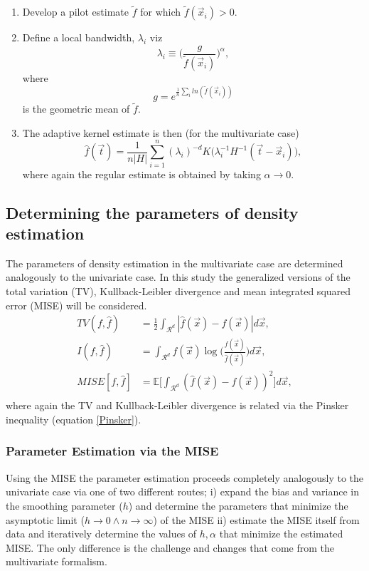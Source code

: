 \begin{enumerate}
	\item Develop a pilot estimate $\tilde{f}$ for which $\tilde{f}(\vec{x}_i)>0$.
	\item Define a local bandwidth, $\lambda_i$ viz
	\begin{equation}
		\lambda_i\equiv \bigg(\frac{g}{\tilde{f}(\vec{x}_i)}\bigg)^\alpha,
	\end{equation}
	where
	\begin{equation}
		g=e^{\frac{1}{n}\sum_{i}ln(\tilde{f}(\vec{x}_i))}
	\end{equation}
	is the geometric mean of $\tilde{f}$.
	\item The adaptive kernel estimate is then (for the multivariate case) 
	\begin{equation}
		\hat{f}(\vec{t})=\frac{1}{n|H|}\sum_{i=1}^n(\lambda_i)^{-d}K\big(\lambda_i^{-1}H^{-1}(\vec{t}-\vec{x}_i)\big),
		\label{rescaled2}
	\end{equation}
	where again the regular estimate is obtained by taking $\alpha\rightarrow 0$.
\end{enumerate}

\subsection{Determining the parameters of density estimation}
The parameters of density estimation in the multivariate case are determined analogously to the univariate case. In this study the generalized versions of the total variation (TV), Kullback-Leibler divergence and mean integrated squared error (MISE) will be considered.
\begin{equation}
	\begin{split}
		TV(f,\hat{f})&=\frac{1}{2}\int_{\mathcal{R}^d} |\hat{f}(\vec{x})-f(\vec{x})|d\vec{x},\\
		I(f,\hat{f})&=\int_{\mathcal{R}^d} f(\vec{x})\log\bigg(\frac{f(\vec{x})}{\hat{f}(\vec{x})}\bigg)d\vec{x},\\
		MISE[f,\hat{f}]&= \mathbb{E}\bigg[\int_{\mathcal{R}^d}(\hat{f}(\vec{x})-f(\vec{x}))^2\bigg]d\vec{x},\\
	\end{split}
\end{equation}
where again the TV and Kullback-Leibler divergence is related via the Pinsker inequality (equation \eqref{Pinsker}).

\subsubsection{Parameter Estimation via the MISE}
Using the MISE the parameter estimation proceeds completely analogously to the univariate case via one of two different routes; i) expand the bias and variance in the smoothing parameter ($h$) and determine the parameters that minimize the asymptotic limit ($h\rightarrow 0\wedge  n\rightarrow \infty$) of the MISE ii) estimate the MISE itself from data and iteratively determine the values of $h,\alpha$ that minimize the estimated MISE. The only difference is the challenge and changes that come from the multivariate formalism.  

